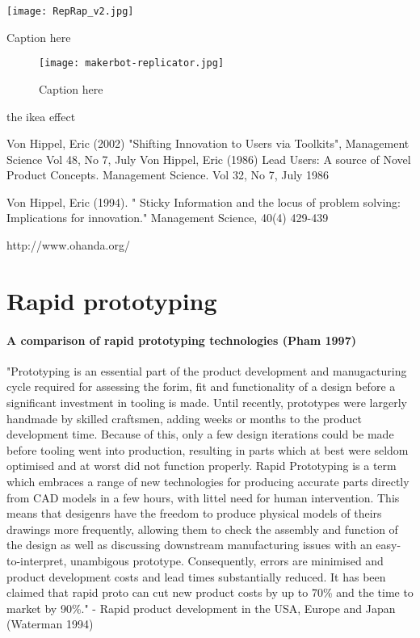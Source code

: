 \begin{NFfigure}
    \begin{center}
        \texttt{[image: RepRap\_v2.jpg]}
    \end{center}
    \caption{Caption here}
    \label{fig:RepRap_v2}
\end{NFfigure}




\begin{figure}[]
    \begin{center}
        \texttt{[image: makerbot-replicator.jpg]}
    \end{center}
    \caption{Caption here}
    \label{fig:makerbot-replicator}
\end{figure}

the ikea effect

Von Hippel, Eric (2002) "Shifting Innovation to Users via Toolkits", Management Science Vol 48, No 7, July
 Von Hippel, Eric (1986) Lead Users: A source of Novel Product Concepts. Management Science. Vol 32, No 7,
July 1986

Von Hippel, Eric (1994). " Sticky Information and the locus of problem solving: Implications for innovation."
Management Science, 40(4) 429-439

http://www.ohanda.org/


\section{Rapid prototyping} %

\paragraph{A comparison of rapid prototyping technologies (Pham 1997)}

"Prototyping is an essential part of the product development and manugacturing cycle required for assessing the forim, fit and functionality of a design before a significant investment in tooling is made. Until recently, prototypes were largerly handmade by skilled craftsmen, adding weeks or months to the product development time. Because of this, only a few design iterations could be made before tooling went into production, resulting in parts which at best were seldom optimised and at worst did not function properly.
Rapid Prototyping is a term which embraces a range of new technologies for producing accurate parts directly from CAD models in a few hours, with littel need for human intervention. This means that desigenrs have the freedom to produce physical models of theirs drawings more frequently, allowing them to check the assembly and function of the design as well as discussing downstream manufacturing issues with an easy-to-interpret, unambigous prototype. Consequently, errors are minimised and product development costs and lead times substantially reduced. It has been claimed that rapid proto can cut new product costs by up to 70\% and the time to market by 90\%."
- Rapid product development in the USA, Europe and Japan (Waterman 1994)


